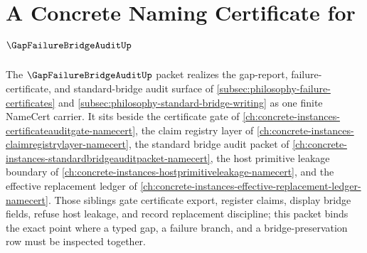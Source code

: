 \chapter{A Concrete Naming Certificate for $\GapFailureBridgeAuditUp$}
\label{ch:concrete-instances-gap-failure-bridge-audit-namecert}

The $\GapFailureBridgeAuditUp$ packet realizes the gap-report, failure-certificate, and standard-bridge audit surface of \autoref{subsec:philosophy-failure-certificates} and \autoref{subsec:philosophy-standard-bridge-writing} as one finite NameCert carrier. It sits beside the certificate gate of \autoref{ch:concrete-instances-certificateauditgate-namecert}, the claim registry layer of \autoref{ch:concrete-instances-claimregistrylayer-namecert}, the standard bridge audit packet of \autoref{ch:concrete-instances-standardbridgeauditpacket-namecert}, the host primitive leakage boundary of \autoref{ch:concrete-instances-hostprimitiveleakage-namecert}, and the effective replacement ledger of \autoref{ch:concrete-instances-effective-replacement-ledger-namecert}. Those siblings gate certificate export, register claims, display bridge fields, refuse host leakage, and record replacement discipline; this packet binds the exact point where a typed gap, a failure branch, and a bridge-preservation row must be inspected together.

